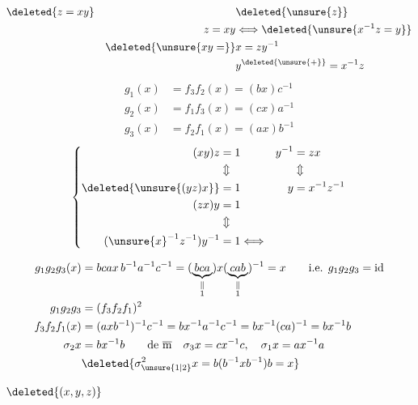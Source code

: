 \[
\begin{aligned}
&\deleted{z=xy}&&\deleted{\unsure{z}}\\
&&z=xy&\Longleftrightarrow\deleted{\unsure{x^{-1}z=y}}\\
&&\deleted{\unsure{xy=}}&x=zy^{-1}\\
&&&y^{\deleted{\unsure{+}}}=x^{-1}z
\end{aligned}
\]
\[
\begin{aligned}
g_1(x)&=f_3f_2(x)=(bx)c^{-1}\\
g_2(x)&=f_1f_3(x)=(cx)a^{-1}\\
g_3(x)&=f_2f_1(x)=(ax)b^{-1}
\end{aligned}
\]
\[
\left\{\begin{aligned}
(xy)z&=1 &y^{-1}&=zx\\
&\Updownarrow &&\Updownarrow\\
\deleted{\unsure{(yz)x}}&=1 &y&=x^{-1}z^{-1}\\
(zx)y&=1\\
&\Updownarrow\\
({\unsure{x}}^{-1}z^{-1})y^{-1}&=1\Longleftrightarrow
\end{aligned}\right.
\]

\[
\begin{aligned}
g_1g_2g_3(x)&=bcax\,b^{-1}a^{-1}c^{-1}
=(\underbrace{bca}_{\substack{\|\\1}})x(\underbrace{cab}_{\substack{\|\\1}})^{-1}=x\qquad\text{i.e. }g_1g_2g_3=\mathrm{id}\\
g_1g_2g_3&=(f_3f_2f_1)^2\\
f_3f_2f_1(x)&=(axb^{-1})^{-1}c^{-1}=bx^{-1}a^{-1}c^{-1}=bx^{-1}(ca)^{-1}=bx^{-1}b\\
\sigma_2x&=bx^{-1}b\qquad\text{de }\overline{\mathrm m}\quad\sigma_3 x=cx^{-1}c,\quad\sigma_1x=ax^{-1}a\\
&\deleted{\sigma_{\unsure{1|2}}^2 x=b(b^{-1}xb^{-1})b=x}
\end{aligned}
\]

$\deleted{(x,y,z)}$

